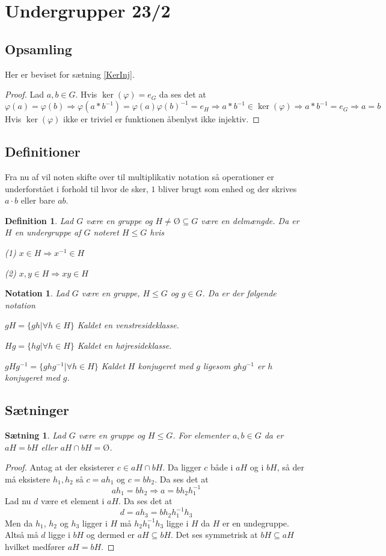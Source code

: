 \documentclass{article}
\newcommand{\inv}{^{-1}}
\newcommand{\imp}{\Rightarrow}
\newtheorem{setn}{Sætning}
\newtheorem{defi}{Definition}
\newtheorem{nota}{Notation}
\begin{document}
	\section*{Undergrupper 23/2}
		\subsection*{Opsamling}
		Her er beviset for sætning \ref{KerInj}.
		\begin{proof}
			Lad $a,b \in G$.
			Hvis $\ker(\varphi) = {e_G}$ da ses det at
			$$\varphi(a) = \varphi(b) \imp \varphi(a*b\inv)=\varphi(a)\varphi(b)\inv=e_H
			\imp a*b\inv \in \ker(\varphi) \imp a*b\inv = e_G \imp a = b$$
			Hvis $\ker(\varphi)$ ikke er triviel er funktionen åbenlyst ikke injektiv.
		\end{proof}
		\subsection*{Definitioner}
		Fra nu af vil noten skifte over til multiplikativ notation så operationer
		er underforstået i forhold til hvor de sker, $1$ bliver brugt som enhed 
  		og der skrives $a\cdot b$ eller bare $ab$.
		\begin{defi}
			Lad $G$ være en gruppe og $H \ne Ø \subseteq G$ være en delmængde.
			Da er $H$ en undergruppe af $G$ noteret $H \le G$ hvis

			(1) $x \in H \imp x\inv \in H$

			(2) $x,y \in H \imp xy \in H$
		\end{defi}
		\begin{nota}
			Lad $G$ være en gruppe, $H \le G$ og $g \in G$. Da er der følgende notation

			$gH = \{gh | \forall h \in H\}$ Kaldet en venstresideklasse.

			$Hg = \{hg | \forall h \in H\}$ Kaldet en højresideklasse.

			$gHg\inv = \{ghg\inv | \forall h \in H\}$
			Kaldet $H$ konjugeret med $g$ ligesom $ghg\inv$ er $h$ konjugeret med $g$.
		\end{nota}
		\subsection*{Sætninger}
		\begin{setn} \label{SidKlaPar}
			Lad $G$ være en gruppe og $H \le G$. For elementer $a, b \in G$ da er
			$aH = bH$ eller $aH\cap bH = Ø$.
		\end{setn}
		\begin{proof}
			Antag at der eksisterer $c \in aH\cap bH$. Da ligger $c$ både i $aH$ og i $bH$, så
			der må eksistere $h_1, h_2$ så $c = ah_1$ og $c = bh_2$. Da ses det at
			$$ah_1 = bh_2 \imp a=bh_2h_1\inv$$
			Lad nu $d$ være et element
			i $aH$. Da ses det at
			$$d = ah_3=bh_2h_1\inv h_3$$
			Men da $h_1$, $h_2$ og $h_3$ ligger i $H$ må $h_2h_1\inv h_3$ ligge i $H$
			da $H$ er en undegruppe. Altså må $d$ ligge i $bH$ og dermed er $aH \subseteq bH$.
			Det ses symmetrisk at $bH \subseteq aH$ hvilket medfører $aH = bH$.
		\end{proof}
\end{document}
